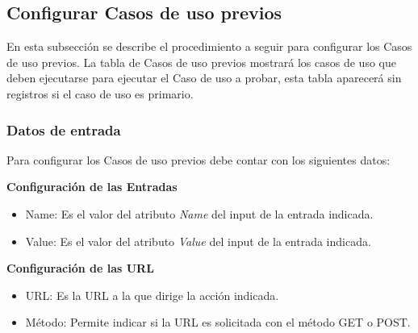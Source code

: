 \subsection{Configurar Casos de uso previos}
En esta subsección se describe el procedimiento a seguir para configurar los Casos de uso previos. La tabla de Casos de uso previos mostrará los casos de uso que deben ejecutarse para ejecutar el Caso de uso a probar, esta tabla aparecerá sin 
registros si el caso de uso es primario.

\subsubsection{Datos de entrada}
\begin{description}
	\item Para configurar los Casos de uso previos debe contar con los siguientes datos: \hspace{10pt}
	
	\begin{description}
	    \item \textbf{Configuración de las Entradas}
	    \begin{itemize}
		  \item Name: Es el valor del atributo \emph{Name} del input de la entrada indicada.
		  \item Value: Es el valor del atributo \emph{Value} del input de la entrada indicada.
	    \end{itemize}
	    \item \textbf{Configuración de las URL}
	    \begin{itemize}
		  \item URL: Es la URL a la que dirige la acción indicada.
		  \item Método: Permite indicar si la URL es solicitada con el método GET o POST.
	    \end{itemize}
	 \end{description}
\end{description}

